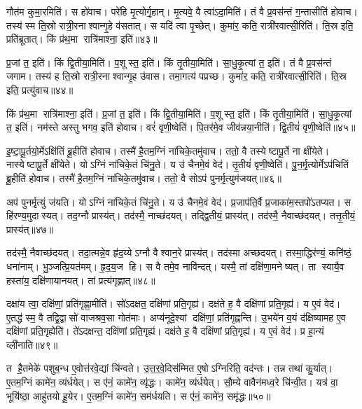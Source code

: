    गौत॑म कुमा॒रमिति॑।
   स हो॑वाच।
   परे॑हि मृ॒त्योर्गृ॒हान्।
   मृ॒त्यवे॒ वै त्वा॑ऽदा॒मिति॑।
   तं वै प्र॒वस॑न्तं ग॒न्तासीति॑ होवाच।
   तस्य॑ स्म ति॒स्रो रात्री॒रनाश्वान्गृ॒हे व॑सतात्।
   स यदि॑ त्वा पृ॒च्छेत्।
   कुमा॑र॒ कति॒ रात्री॑रवात्सी॒रिति॑।
   ति॒स्र इति॒ प्रति॑ब्रूतात्।
   किं प्र॑थ॒मा रात्रि॑माश्ना॒ इति॑॥४३॥

   प्र॒जां त॒ इति॑।
   किं द्वि॒तीया॒मिति॑।
   प॒शूस्त॒ इति॑।
   किं तृ॒तीया॒मिति॑।
   सा॒धु॒कृ॒त्यां त॒ इति॑।
   तं वै प्र॒वस॑न्तं जगाम।
   तस्य॑ ह ति॒स्रो रात्री॒रनाश्वान्गृ॒ह उ॑वास।
   तमा॒गत्य॑ पप्रच्छ।
   कुमा॑र॒ कति॒ रात्री॑रवात्सी॒रिति॑।
   ति॒स्र इति॒ प्रत्यु॑वाच॥४४॥

   किं प्र॑थ॒मा रात्रि॑माश्ना॒ इति॑।
   प्र॒जां त॒ इति॑।
   किं द्वि॒तीया॒मिति॑।
   प॒शूस्त॒ इति॑।
   किं तृ॒तीया॒मिति॑।
   सा॒धु॒कृ॒त्यां त॒ इति॑।
   नम॑स्ते अस्तु भगव॒ इति॑ होवाच।
   वरं॑ वृणी॒ष्वेति॑।
   पि॒तर॑मे॒व जीव॑न्नया॒नीति॑।
   द्वि॒तीयं॑ वृणी॒ष्वेति॑॥४५॥

   इ॒ष्टा॒पू॒र्तयो॒र्मेऽक्षि॑तिं ब्रू॒हीति॑ होवाच।
   तस्मै॑ है॒तम॒ग्निं ना॑चिके॒तमु॑वाच।
   ततो॒ वै तस्येष्टापू॒र्ते ना क्षी॑येते।
   नास्येष्टापू॒र्ते क्षी॑येते।
   योऽग्निं ना॑चिके॒तं चि॑नु॒ते।
   य उ॑ चैनमे॒वं वेद॑।
   तृ॒तीयं॑ वृणी॒ष्वेति॑।
   पु॒न॒र्मृ॒त्योर्मेऽप॑चितिं ब्रू॒हीति॑ होवाच।
   तस्मै॑ है॒तम॒ग्निं ना॑चिके॒तमु॑वाच।
   ततो॒ वै सोऽप॑ पुनर्मृ॒त्युम॑जयत्॥४६॥

   अप॑ पुनर्मृ॒त्युं ज॑यति।
   योऽग्निं ना॑चिके॒तं चि॑नु॒ते।
   य उ॑ चैनमे॒वं वेद॑।
   प्र॒जाप॑ति॒र्वै प्र॒जाका॑म॒स्तपो॑ऽतप्यत।
   स हि॑रण्य॒मुदास्यत्।
   तद॒ग्नौ प्रास्य॑त्।
   तद॑स्मै॒ नाच्छ॑दयत्।
   तद्द्वि॒तीयं॒ प्रास्य॑त्।
   तद॑स्मै॒ नैवाच्छ॑दयत्।
   तत्तृ॒तीयं॒ प्रास्य॑त्॥४७॥

   तद॑स्मै॒ नैवाच्छ॑दयत्।
   तदा॒त्मन्ने॒व हृ॑द॒य्येऽग्नौ वैश्वान॒रे प्रास्य॑त्।
   तद॑स्मा अच्छदयत्।
   तस्मा॒द्धिर॑ण्यं॒ कनि॑ष्ठं॒ धना॑नाम्।
   भु॒ञ्जत्प्रि॒यत॑मम्।
   हृ॒द॒य॒ज हि।
   स वै तमे॒व नावि॑न्दत्।
   यस्मै॒ तां दक्षि॑णा॒मनेष्यत्।
   ता स्वायै॒व हस्ता॑य॒ दक्षि॑णायानयत्।
   तां प्रत्य॑गृह्णात्॥४८॥

   दक्षा॑य त्वा॒ दक्षि॑णां॒ प्रति॑गृह्णा॒मीति॑।
   सो॑ऽदक्षत॒ दक्षि॑णां प्रति॒गृह्य॑।
   दक्ष॑ते ह॒ वै दक्षि॑णां प्रति॒गृह्य॑।
   य ए॒वं वेद॑।
   ए॒तद्ध॑ स्म॒ वै तद्वि॒द्वासो॑ वाजश्रव॒सा गोत॑माः।
   अप्य॑नूदे॒श्यां दक्षि॑णां॒ प्रति॑गृह्णन्ति।
   उ॒भये॑न व॒यं द॑क्षिष्यामह ए॒व दक्षि॑णां प्रति॒गृह्येति॑।
   ते॑ऽदक्षन्त॒ दक्षि॑णां प्रति॒गृह्य॑।
   दक्ष॑ते ह॒ वै दक्षि॑णां प्रति॒गृह्य॑।
   य ए॒वं वेद॑।
   प्र  हा॒न्यं व्ली॑नाति॥४९॥
   \anuvakamend
  
   त है॒तमेके॑ पशुब॒न्ध ए॒वोत्त॑रवे॒द्यां चि॑न्वते।
   उ॒त्त॒र॒वे॒दिस॑म्मित ए॒षोऽग्निरिति॒ वद॑न्तः।
   तन्न तथा॑ कु॒र्यात्।
   ए॒तम॒ग्निं कामे॑न॒ व्य॑र्धयेत्।
   स ए॑नं॒ कामे॑न॒ व्यृ॑द्धः।
   कामे॑न॒ व्य॑र्धयेत्।
   सौ॒म्ये वावैन॑मध्व॒रे चि॑न्वी॒त।
   यत्र॑ वा॒ भूयि॑ष्ठा॒ आहु॑तयो हू॒येर\sn{}।
   ए॒तम॒ग्निं कामे॑न॒ सम॑र्धयति।
   स ए॑नं॒ कामे॑न॒ समृ॑द्धः॥५०॥


